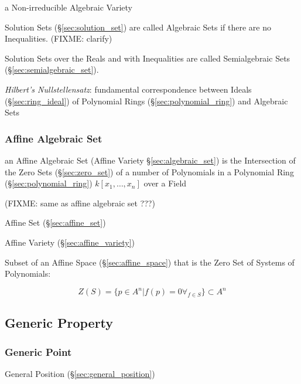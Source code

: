 a Non-irreducible Algebraic Variety

Solution Sets (\S\ref{sec:solution_set}) are called Algebraic Sets if there are
no Inequalities. (FIXME: clarify)

Solution Sets over the Reals and with Inequalities are called Semialgebraic
Sets (\S\ref{sec:semialgebraic_set}).

\emph{Hilbert's Nullstellensatz}: fundamental correspondence between Ideals
(\S\ref{sec:ring_ideal}) of Polynomial Rings (\S\ref{sec:polynomial_ring}) and
Algebraic Sets



\subsubsection{Affine Algebraic Set}\label{sec:affine_algebraic_set}

an Affine Algebraic Set (Affine Variety \S\ref{sec:algebraic_set}) is the
Intersection of the Zero Sets (\S\ref{sec:zero_set}) of a number of Polynomials
in a Polynomial Ring (\S\ref{sec:polynomial_ring}) $k[x_1,\ldots,x_n]$ over a
Field

(FIXME: same as affine algebraic set ???)


Affine Set (\S\ref{sec:affine_set})

Affine Variety (\S\ref{sec:affine_variety})

Subset of an Affine Space (\S\ref{sec:affine_space}) that is the Zero Set of
Systems of Polynomials:

\[
  Z(S) = \{ p \in A^n | f(p) = 0 \forall_{f \in S} \} \subset A^n
\]



\subsection{Generic Property}\label{sec:generic_property}

\subsubsection{Generic Point}\label{sec:generic_point}

\fist General Position (\S\ref{sec:general_position})

